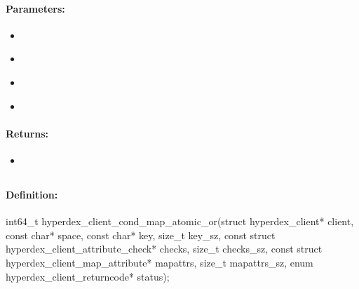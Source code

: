 \paragraph{Parameters:}
\begin{itemize}[noitemsep]
\item {}\\

\item {}\\

\item {}\\

\item {}\\

\end{itemize}

\paragraph{Returns:}
\begin{itemize}[noitemsep]
\item {}\\

\end{itemize}

\pagebreak
\subsection{}
\label{api:c:cond_map_atomic_or}


\paragraph{Definition:}
\begin{ccode}
int64_t hyperdex_client_cond_map_atomic_or(struct hyperdex_client* client,
        const char* space,
        const char* key, size_t key_sz,
        const struct hyperdex_client_attribute_check* checks, size_t checks_sz,
        const struct hyperdex_client_map_attribute* mapattrs, size_t mapattrs_sz,
        enum hyperdex_client_returncode* status);
\end{ccode}

